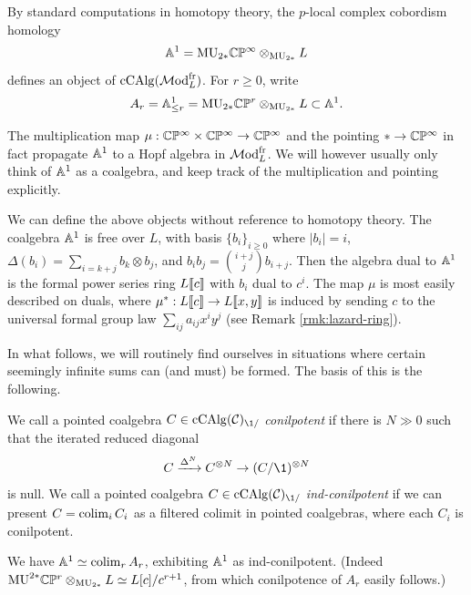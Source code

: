 \begin{definition} \label{def:A1}
By standard computations in homotopy theory, the $p$-local complex cobordism homology
\[\mathbb A^1=\mathrm{MU}_{2*}\mathbb C\mathbb P^\infty\otimes_{\mathrm{MU}_{2*}}L\]
defines an object of $\mathrm{cCAlg}(\mathcal{M}\mathrm{od}_L^{\mathrm{fr}})$.
For $r\ge 0$, write
\[A_r=\mathbb A^1_{\le r}=\mathrm{MU}_{2*}\mathbb C\mathbb P^r\otimes_{\mathrm{MU}_{2*}}L\subset\mathbb A^1.\]
\end{definition}
\begin{remark}
The multiplication map $\mu: \mathbb C\mathbb P^\infty \times \mathbb C\mathbb P^\infty \to \mathbb C\mathbb P^\infty$ and the pointing $* \to \mathbb C\mathbb P^\infty$ in fact propagate $\mathbb A^1$ to a Hopf algebra in $\mathcal{M}\mathrm{od}_L^{\mathrm{fr}}$.
We will however usually only think of $\mathbb A^1$ as a coalgebra, and keep track of the multiplication and pointing explicitly.
\end{remark}
\begin{remark}
We can define the above objects without reference to homotopy theory.
The coalgebra $\mathbb A^1$ is free over $L$, with basis $\{b_i\}_{i \ge 0}$ where $|b_i| = i$, $\Delta(b_i) = \sum_{i = k+j} b_k \otimes b_j$, and $b_i b_j = {i+j \choose j} b_{i+j}$.
Then the algebra dual to $\mathbb A^1$ is the formal power series ring $L\llbracket c \rrbracket$ with $b_i$ dual to $c^i$.
The map $\mu$ is most easily described on duals, where $\mu^*: L\llbracket c \rrbracket \to L\llbracket x,y \rrbracket$ is induced by sending $c$ to the universal formal group law $\sum_{ij} a_{ij} x^i y^j$ (see Remark \ref{rmk:lazard-ring}).
\end{remark}

In what follows, we will routinely find ourselves in situations where certain seemingly infinite sums can (and must) be formed.
The basis of this is the following.
\begin{definition} \label{def:conil}
We call a pointed coalgebra $C \in \cCAlg(\scr C)_{\1/}$ \emph{conilpotent} if there is $N \gg 0$ such that the iterated reduced diagonal \[ C \xrightarrow{\Delta^N} C^{\otimes N} \to (C/\1)^{\otimes N} \] is null.
We call a pointed coalgebra $C \in \cCAlg(\scr C)_{\1/}$ \emph{ind-conilpotent} if we can present $C = \operatorname*{colim}_i C_i$ as a filtered colimit in pointed coalgebras, where each $C_i$ is conilpotent.
\end{definition}
\begin{example}
We have $\mathbb A^1 \simeq \operatorname*{colim}_r A_r$, exhibiting $\mathbb A^1$ as ind-conilpotent.
(Indeed $\mathrm{MU}^{2*}\mathbb C\mathbb P^r\otimes_{\mathrm{MU}_{2*}}L\simeq L[c]/c^{r+1}$, from which conilpotence of $A_r$ easily follows.)
\end{example}

